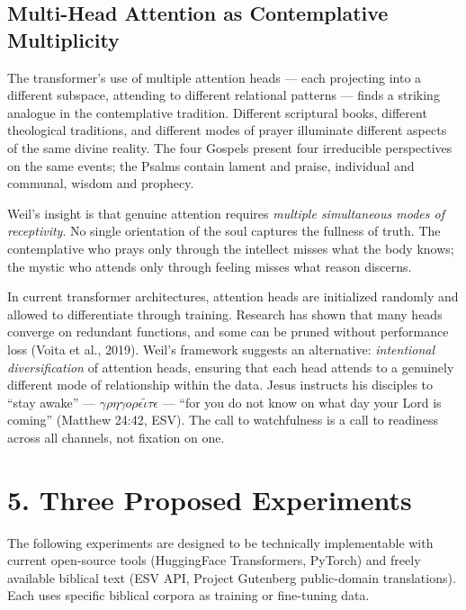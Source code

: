 \documentclass[10pt, letterpaper, twocolumn]{article}
\begin{document}
\subsection*{Multi-Head Attention as Contemplative Multiplicity}\label{multi-head-attention-as-contemplative-multiplicity}

The transformer's use of multiple attention heads --- each projecting into a different subspace, attending to different relational patterns --- finds a striking analogue in the contemplative tradition. Different scriptural books, different theological traditions, and different modes of prayer illuminate different aspects of the same divine reality. The four Gospels present four irreducible perspectives on the same events; the Psalms contain lament and praise, individual and communal, wisdom and prophecy.

Weil's insight is that genuine attention requires \emph{multiple simultaneous modes of receptivity}. No single orientation of the soul captures the fullness of truth. The contemplative who prays only through the intellect misses what the body knows; the mystic who attends only through feeling misses what reason discerns.

In current transformer architectures, attention heads are initialized randomly and allowed to differentiate through training. Research has shown that many heads converge on redundant functions, and some can be pruned without performance loss (Voita et al., 2019). Weil's framework suggests an alternative: \emph{intentional diversification} of attention heads, ensuring that each head attends to a genuinely different mode of relationship within the data. Jesus instructs his disciples to ``stay awake'' --- \(\gamma\rho\eta\gamma o\rho\epsilon\tilde{\iota}\tau\epsilon\) --- ``for you do not know on what day your Lord is coming'' (Matthew 24:42, ESV). The call to watchfulness is a call to readiness across all channels, not fixation on one.

\section*{5. Three Proposed Experiments}\label{three-proposed-experiments}

The following experiments are designed to be technically implementable with current open-source tools (HuggingFace Transformers, PyTorch) and freely available biblical text (ESV API, Project Gutenberg public-domain translations). Each uses specific biblical corpora as training or fine-tuning data.
\end{document}

